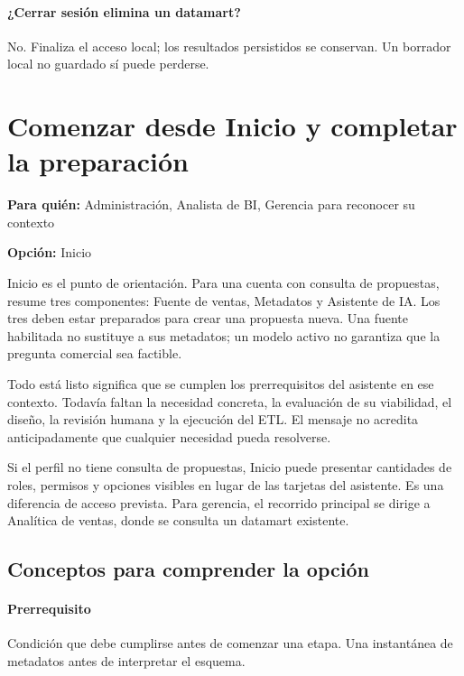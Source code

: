 \paragraph{¿Cerrar sesión elimina un datamart?} No. Finaliza el acceso local; los resultados persistidos se conservan. Un borrador local no guardado sí puede perderse.


\section{Comenzar desde Inicio y completar la preparación}
\label{unidad:operacion_02}
\textbf{Para quién:} Administración, Analista de BI, Gerencia para reconocer su contexto\par
\textbf{Opción:} Inicio\par

Inicio es el punto de orientación. Para una cuenta con consulta de propuestas, resume tres componentes: Fuente de ventas, Metadatos y Asistente de IA. Los tres deben estar preparados para crear una propuesta nueva. Una fuente habilitada no sustituye a sus metadatos; un modelo activo no garantiza que la pregunta comercial sea factible.

Todo está listo significa que se cumplen los prerrequisitos del asistente en ese contexto. Todavía faltan la necesidad concreta, la evaluación de su viabilidad, el diseño, la revisión humana y la ejecución del ETL. El mensaje no acredita anticipadamente que cualquier necesidad pueda resolverse.

Si el perfil no tiene consulta de propuestas, Inicio puede presentar cantidades de roles, permisos y opciones visibles en lugar de las tarjetas del asistente. Es una diferencia de acceso prevista. Para gerencia, el recorrido principal se dirige a Analítica de ventas, donde se consulta un datamart existente.

\subsection{Conceptos para comprender la opción}
\paragraph{Prerrequisito} Condición que debe cumplirse antes de comenzar una etapa. Una instantánea de metadatos antes de interpretar el esquema.

